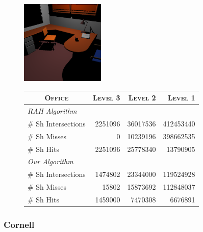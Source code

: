     
\begin{figure}[!htb]
    \begin{minipage}{0.25\linewidth}
        \centering
        \includegraphics[width=4.0cm]{Images/Office_Preview}
    \end{minipage}
    \begin{minipage}{0.725\linewidth}
        \centering
        \fontsize{8}{10}
        \selectfont
        \begin{tabular}[h]{l|rrr}
            \multicolumn{1}{c|}{\textsc{Office}} & \textsc{Level 3} & \textsc{Level 2} & \textsc{Level 1}\\
            \hline
            \emph{RAH Algorithm} & & \\
            \hline
            \quad \# Sh Intersections   & 2251096   & 36017536	& 412453440	\\
            \quad \# Sh Misses          & 0	        & 10239196	& 398662535	\\
            \quad \# Sh Hits            & 2251096	& 25778340  & 13790905	\\
            \hline
            \emph{Our Algorithm} & & \\
            \hline
            \quad \# Sh Intersections  & 1474802	& 23344000	& 119524928	\\
            \quad \# Sh Misses         & 15802		& 15873692	& 112848037	\\
            \quad \# Sh Hits           & 1459000	& 7470308	& 6676891	\\
        \end{tabular}
        \label{table:office-d16-n3-results}
    \end{minipage}
\end{figure}

\subsubsection{Cornell}


